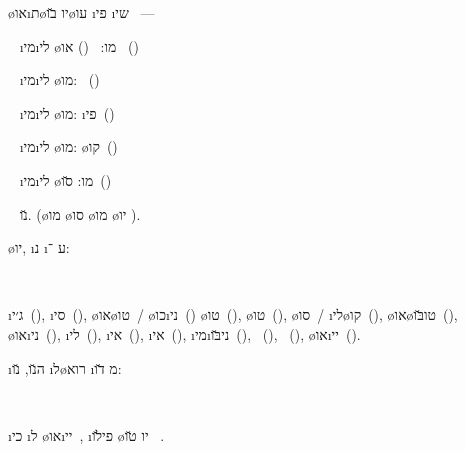 \begin{framed}
	\o{או}\i{ת}\o{יו} \u{בו}\o{עו} \i{פי} \i{שי} ~—
\begin{compactitem}
\item {} ~ \i{מי}\i{לי} \o{מו}: ~() או ~()
\item {} ~ \i{מי}\i{לי} \o{מו}: ~()
\item {} ~ \i{מי}\i{לי} \o{מו}: \i{פי}~()
\item {} ~ \i{מי}\i{לי} \o{מו}: \o{קו}~()
\item {} ~ \i{מי}\i{לי} \o{מו}: \u{סו}~()
\item {} ~  \u{נו}. (\o{מו} \o{סו} \o{מו}  \o{יו} ).
\end{compactitem}

 \o{יו}, \i{נ}  \i{ע} ־:

~\hfill\begin{minipage}[t]{0.95\linewidth}
	\i{ג׳י}~(),
	\i{סי}~(),
	\o{או}\o{טו}~/ \o{כו}\i{ני}~()
	\o{טו}~(),
	\o{טו}~(),
	\o{סו}~/ \i{לי}\o{קו}~(),
	\o{או}\o{טו}\u{בּו}~(),
	\o{או}\i{ני}~(),
	\i{לי}~(),
	\i{אי}~(),
	\i{אי}~(),
	\i{מי}\i{ני}\u{בּו}~(),
	~(),
	~(),
	\o{או}\i{יי}~().
\end{minipage}

 \i{ה}\u{נו}, \u{נו} \i{ל}\o{רוא} \i{מ} \u{דו}:

~\hfill\begin{minipage}[t]{0.95\linewidth}
	\i{כי}  \i{ל}  \o{או}\i{יי}~,  \i{פי}\u{לו} \o{יו}  \u{טו} ~.
\end{minipage}


\end{framed}
